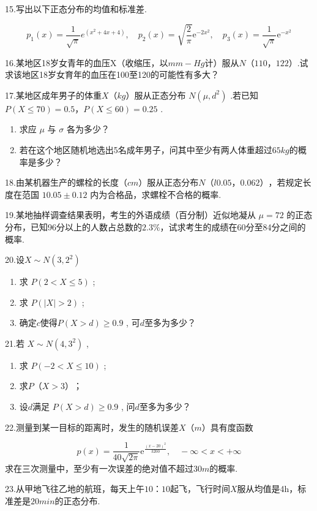 15.写出以下正态分布的均值和标准差.

\[
p_{1}(x)=\frac{1}{\sqrt{\pi}} e^{\left(x^{2}+4 x+4\right)}, \quad p_{2}(x)=\sqrt{\frac{2}{\pi}} \mathrm{e}^{-2 x^{2}}, \quad p_{3}(x)=\frac{1}{\sqrt{\pi}} \mathrm{e}^{-x^{2}}
\]

16.某地区18岁女青年的血压X（收缩压，以$ mm-Hg $计）服从$ N（110，122） $.试求该地区18岁女育年的血压在100至120的可能性有多大？

17.某地区成年男子的体重$ X（kg） $服从正态分布 $N\left(\mu, d^{2}\right)$ .若已知 $P(X \leqslant 70)=0.5 ， P(X \leqslant 60)=0.25 $ .
\begin{enumerate}
	\item 求应 $\mu$ 与 $\sigma$ 各为多少？
	\item 若在这个地区随机地选出5名成年男子，问其中至少有两人体重超过$ 65kg $的概率是多少？
\end{enumerate}

18.由某机器生产的螺栓的长度$ （cm） $服从正态分布$ N（l0.05，0.062） $，若规定长度在范国 $10.05 \pm 0.12$ 内为合格品，求螺栓不合格的概率.

19.某地抽样调查结果表明，考生的外语成绩（百分制）近似地凝从 $\mu=72$ 的正态分布，已知96分以上的人数占总数的$ 2.3\% $，试求考生的成绩在60分至84分之间的概率.

20.设$X \sim N\left(3,2^{2}\right)$

\begin{enumerate}
	\item 求 $P(2<X \leqslant 5)$ ;
	\item 求 $P(|X|>2)$ ;
	\item 确定$ c $使得$ P(X>d) \geqslant 0.9  $ , 可$ d $至多为多少？
\end{enumerate}

21.若 $X \sim N\left(4,3^{2}\right)$ ,
\begin{enumerate}
	\item 求 $P(-2<X \leqslant 10)$ ;
	\item 求$ P（X>3） $；
	\item 设$ d $满足 $P(X>d)  \geqslant 0.9$ , 问$ d $至多为多少？
\end{enumerate}

22.测量到某一目标的距离时，发生的随机误差$ X（m） $具有度函数

\[
p(x)=\frac{1}{40 \sqrt{2 \pi}} \mathrm{e}^{\frac{(x-20)^{2}}{3200}}, \quad-\infty<x<+\infty
\]
求在三次测量中，至少有一次误差的绝对值不超过$ 30m $的概率.

23.从甲地飞往乙地的航班，每天上午$ 10：10 $起飞，飞行时间$ X $服从均值是4h，标准差是$ 20min $的正态分布.

